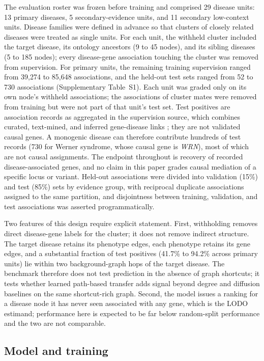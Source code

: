 \documentclass[11pt]{article}
\begin{document}
The evaluation roster was frozen before training and comprised 29 disease units: 13 primary diseases, 5 secondary-evidence units, and 11 secondary low-context units. Disease families were defined in advance so that clusters of closely related diseases were treated as single units. For each unit, the withheld cluster included the target disease, its ontology ancestors (9 to 45 nodes), and its sibling diseases (5 to 185 nodes); every disease-gene association touching the cluster was removed from supervision. For primary units, the remaining training supervision ranged from 39,274 to 85,648 associations, and the held-out test sets ranged from 52 to 730 associations (Supplementary Table~S1). Each unit was graded only on its own node's withheld associations; the associations of cluster mates were removed from training but were not part of that unit's test set. Test positives are association records as aggregated in the supervision source, which combines curated, text-mined, and inferred gene-disease links \cite{pineiro2020}; they are not validated causal genes. A monogenic disease can therefore contribute hundreds of test records (730 for Werner syndrome, whose causal gene is \textit{WRN}), most of which are not causal assignments. The endpoint throughout is recovery of recorded disease-associated genes, and no claim in this paper grades causal mediation of a specific locus or variant. Held-out associations were divided into validation (15\%) and test (85\%) sets by evidence group, with reciprocal duplicate associations assigned to the same partition, and disjointness between training, validation, and test associations was asserted programmatically.

Two features of this design require explicit statement. First, withholding removes direct disease-gene labels for the cluster; it does not remove indirect structure. The target disease retains its phenotype edges, each phenotype retains its gene edges, and a substantial fraction of test positives (41.7\% to 94.2\% across primary units) lie within two background-graph hops of the target disease. The benchmark therefore does not test prediction in the absence of graph shortcuts; it tests whether learned path-based transfer adds signal beyond degree and diffusion baselines on the same shortcut-rich graph. Second, the model issues a ranking for a disease node it has never seen associated with any gene, which is the LODO estimand; performance here is expected to be far below random-split performance and the two are not comparable.

\subsection{Model and training}
\end{document}

